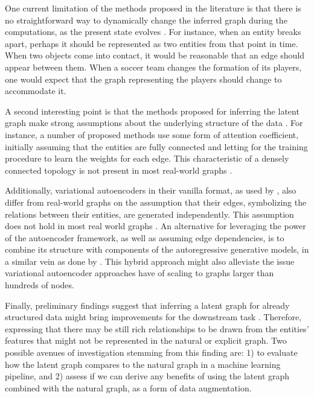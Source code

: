 \documentclass[12pt,a4paper]{article}
\begin{document}
	One current limitation of the methods proposed in the literature is that there is no straightforward way to dynamically change the inferred graph during the computations, as the present state evolves \citep{Battaglia2018}. For instance, when an entity breaks apart, perhaps it should be represented as two entities from that point in time. When two objects come into contact, it would be reasonable that an edge should appear between them. When a soccer team changes the formation of its players, one would expect that the graph representing the players should change to accommodate it.
	
	A second interesting point is that the methods proposed for inferring the latent graph make strong assumptions about the underlying structure of the data \citep{Hamilton2020}. For instance, a number of proposed methods \citep{Watters2017, VanSteenkiste2018} use some form of attention coefficient, initially assuming that the entities are fully connected and letting for the training procedure to learn the weights for each edge. This characteristic of a densely connected topology is not present in most real-world graphs \citep{Newman2019}.
	
	Additionally, variational autoencoders in their vanilla format, as used by \textcite{KipfNRI2018}, also differ from real-world graphs on the assumption that their edges, symbolizing the relations between their entities, are generated independently. This assumption does not hold in most real world graphs \citep{Hamilton2020}. An alternative for leveraging the power of the autoencoder framework, as well as assuming edge dependencies, is to combine its structure with components of the autoregressive generative models, in a similar vein as done by \textcite{Jin2018}. This hybrid approach might also alleviate the issue variational autoencoder approaches have of scaling to graphs larger than hundreds of nodes. 
	
	Finally, preliminary findings suggest that inferring a latent graph for already structured data might bring improvements for the downstream task \citep{KipfNRI2018}. Therefore, expressing that there may be still rich relationships to be drawn from the entities’ features that might not be represented in the natural or explicit graph. Two possible avenues of investigation stemming from this finding are: 1) to evaluate how the latent graph compares to the natural graph in a machine learning pipeline, and 2) assess if we can derive any benefits of using the latent graph combined with the natural graph, as a form of data augmentation.
	
\end{document}
